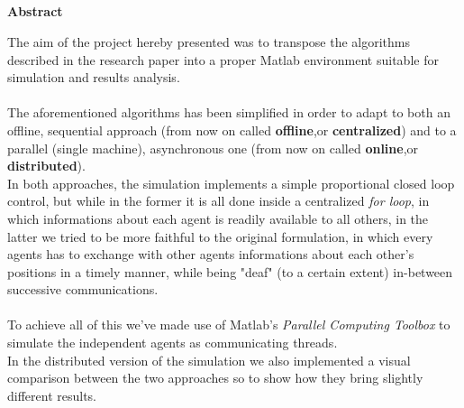 \documentclass[a4paper,11pt,oneside]{book}
\begin{document}
	
	\newpage
	\thispagestyle{empty}
	
	
	
	\begin{center}
		\chapter*{}
		\thispagestyle{empty}
		{\Huge \textbf{Abstract}}\\
		\vspace{15mm}
	\end{center}
	The aim of the project hereby presented was to transpose the algorithms described in the research paper\cite{K1} into a proper Matlab environment suitable for simulation and results analysis.\\\\
	
	The aforementioned algorithms has been simplified in order to adapt to both an offline, sequential approach (from now on called \textbf{offline},or \textbf{centralized}) and to a parallel (single machine), asynchronous one (from now on called \textbf{online},or \textbf{distributed}).\\
	In both approaches, the simulation implements a simple proportional closed loop control, but while in the former it is all done inside a centralized \textit{for loop}, in which informations about each agent is readily available to all others, in the latter we tried to be more faithful to the original formulation, in which every agents has to exchange with other agents informations about each other's positions in a timely manner, while being "deaf" (to a certain extent) in-between successive communications.\\\\
	
	To achieve all of this we've made use of Matlab's \textit{Parallel Computing Toolbox} to simulate the independent agents as communicating threads.\\
	In the distributed version of the simulation we also implemented a visual comparison between the two approaches so to show how they bring slightly different results.
	
	
	
	\tableofcontents \thispagestyle{empty}
	\listoffigures\thispagestyle{empty}
	
\end{document}
